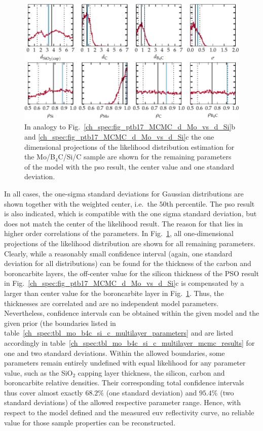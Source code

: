 \begin{figure}[htbp]
\centering
\includegraphics{img/PTB17_MCMC_other_params}
\caption{In analogy to Fig.~\ref{ch_spec:fig_ptb17_MCMC_d_Mo_vs_d_Si}b and \ref{ch_spec:fig_ptb17_MCMC_d_Mo_vs_d_Si}c the one dimensional projections of the likelihood distribution estimation for the Mo/B$_4$C/Si/C sample are shown for the remaining parameters of the model with the \gls{pso} result, the center value and one standard deviation.}
\label{ch_spec:fig_ptb17_MCMC_other_params}
\end{figure}
In all cases, the one-sigma standard deviations for Gaussian distributions are shown together with the weighted center, i.e.~the $50$th percentile. The \gls{pso} result is also indicated, which is compatible with the one sigma standard deviation, but does not match the center of the likelihood result. The reason for that lies in higher order correlations of the parameters. In Fig.~\ref{ch_spec:fig_ptb17_MCMC_other_params}, all one-dimensional projections of the likelihood distribution are shown for all remaining parameters. Clearly, while a reasonably small confidence interval (again, one standard deviation for all distributions) can be found for the thickness of the carbon and boroncarbite layers, the off-center value for the silicon thickness of the PSO result in Fig.~\ref{ch_spec:fig_ptb17_MCMC_d_Mo_vs_d_Si}c is compensated by a larger than center value for the boroncarbite layer in Fig.~\ref{ch_spec:fig_ptb17_MCMC_other_params}. Thus, the thicknesses are correlated and are no independent model parameters. Nevertheless, confidence intervals can be obtained within the given model and the given prior (the boundaries listed in table~\ref{ch_spec:tbl_mo_b4c_si_c_multilayer_parameters} and are listed accordingly in table~\ref{ch_spec:tbl_mo_b4c_si_c_multilayer_mcmc_results} for one and two standard deviations. Within the allowed boundaries, some parameters remain entirely undefined with equal likelihood for any parameter value, such as the SiO$_2$ capping layer thickness, the silicon, carbon and boroncarbite relative densities. Their corresponding total confidence intervals thus cover almost exactly $68.2\%$ (one standard deviation) and $95.4\%$ (two standard deviations) of the allowed respective parameter range. Hence, with respect to the model defined and the measured \gls{euv} reflectivity curve, no reliable value for those sample properties can be reconstructed.
